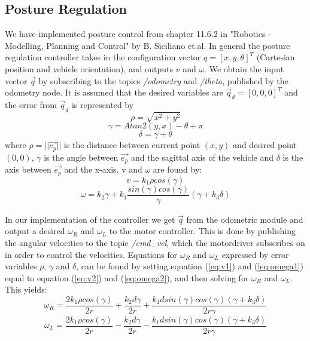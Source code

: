\documentclass[a4paper,10pt]{article}
\begin{document}
		
\subsection{Posture Regulation}

	
		We have implemented posture control from chapter 11.6.2 in  "Robotics - Modelling, Planning and Control" by B. Siciliano et.al. 
		In general the posture regulation controller takes in the configuration vector $q = [x, y, \theta]^{T}$ (Cartesian position and vehicle orientation), 
		and outputs $v$ and $\omega$. We obtain the input vector $\vec{q}$ by subscribing to the topics \textit{/odometry} and \textit{/theta}, published by the odometry node.
		It is assumed that the desired variables are $\vec{q}_{d} = [0, 0, 0]^{T}$ and the error from $\vec{q}_{d}$ is represented by
		\begin{equation}
			\rho = \sqrt{x^{2} + y^{2}} 
		\end{equation}
		\begin{equation} \label{eq:gamma}
			\gamma = Atan2(y, x) - \theta + \pi
		\end{equation}
		\begin{equation}
			\delta = \gamma + \theta
		\end{equation}
		where $\rho = ||\vec{e_{p}}||$ is the distance between current point $(x, y)$ and desired point $(0, 0)$, 
		$\gamma$ is the angle between $\vec{e_{p}}$	and the sagittal axis of the vehicle and $\delta$ is the axis between $\vec{e_{p}}$ and the x-axis.	
		v and $\omega$ are found by:
		\begin{equation} \label{eq:v2}
			v = k_{1}\rho cos(\gamma)
		\end{equation}		
		\begin{equation} \label{eq:omega2}
			\omega = k_{2}\gamma + k_{1}\frac{sin(\gamma)cos(\gamma)}{\gamma}(\gamma + k_{3}\delta)
		\end{equation}
		
		In our implementation of the controller we get $\vec{q}$ from the odometric module and output a desired $\omega_{R}$ and $\omega_{L}$ to the motor controller. 
		This is done by publishing the angular velocities to the topic \textit{/cmd\_vel}, which the motordriver subscribes on in order to control the velocities.
		Equations for $\omega_{R}$ and $\omega_{L}$ expressed by error variables $\rho$, $\gamma$ and $\delta$, can be found
		by setting equation (\ref{eq:v1}) and (\ref{eq:omega1}) equal to equation (\ref{eq:v2}) and (\ref{eq:omega2}), and then solving for $\omega_{R}$ and $\omega_{L}$. This yields:		
		\begin{equation}
			\omega_{R} = \frac{2k_{1}\rho cos(\gamma)}{2r} + \frac{k_{2}d\gamma}{2r} + \frac{k_{1}dsin(\gamma)cos(\gamma)(\gamma + k_{3}\delta)}{2r\gamma}
		\end{equation}
		\begin{equation}
			\omega_{L} = \frac{2k_{1}\rho cos(\gamma)}{2r} - \frac{k_{2}d\gamma}{2r} - \frac{k_{1}dsin(\gamma)cos(\gamma)(\gamma + k_{3}\delta)}{2r\gamma}
		\end{equation}
\end{document}
